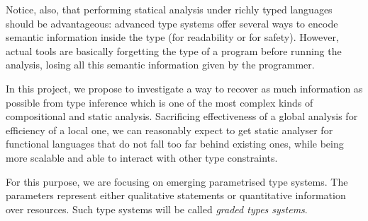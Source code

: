 \documentclass{article}[11pt]
\begin{document}
Notice, also, that performing statical analysis under richly typed languages should be advantageous:  advanced type systems offer several ways to encode semantic information inside the type (for readability or for safety). However, actual tools are basically forgetting the type of a program before running the analysis, losing all this semantic information given by the programmer.

In this project, we propose to investigate a way to recover as much information as possible from type inference which is one of the most complex kinds of compositional and static analysis. %
Sacrificing effectiveness of a global analysis for efficiency of a local one, we can reasonably expect to get static analyser for functional languages that do not fall too far behind existing ones, while being more scalable and able to interact with other type constraints.


For this purpose, we are focusing on emerging parametrised type systems. The parameters represent either qualitative statements or quantitative information over resources. Such type systems will be called {\em graded types systems}.
\end{document}
